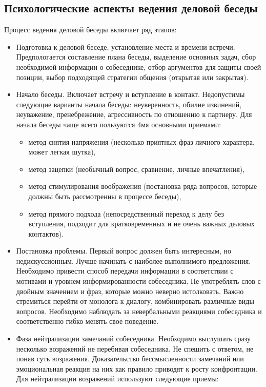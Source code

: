 \subsection{Психологические аспекты ведения деловой беседы}
Процесс ведения деловой беседы включает ряд этапов:
\begin{itemize}
	\item Подготовка к деловой беседе, установление места и времени встречи. Предпологается составление плана беседы, выделение основных задач, сбор необходимой информации о собеседнике, отбор аргументов для защиты своей позиции, выбор подходящей стратегии общения (открытая или закрытая).
	\item Начало беседы. Включает встречу и вступление в контакт. Недопустимы следующие варианты начала беседы: неуверенность, обилие извинений, неуважение, пренебрежение, агрессивность по отношению к партнеру. Для начала беседы чаще всего пользуются 4мя основными приемами:
		\begin{itemize}
			\item метод снятия напряжения (несколько приятных фраз личного характера, может легкая шутка),
			\item метод зацепки (необычный вопрос, сравнение, личные впечатления),
			\item метод стимулирования воображения (постановка ряда вопросов, которые должны быть рассмотренны в процессе беседы),
			\item метод прямого подхода (непосредственный переход к делу без вступления, подходит для кратковременных и не очень важных деловых контактов).
		\end{itemize}
	\item Постановка проблемы. Первый вопрос должен быть интересным, но недискуссионным. Лучше начинать с наиболее выполнимого предложения. Необходимо привести способ передачи информации в соответствии с мотивами и уровнем информированности собеседника. Не употреблять слов с двойным значением и фраз, которые можно неверно истолковать. Важно стремиться перейти от монолога к диалогу, комбинировать различные виды вопросов. Необходимо наблюдать за невербальными реакциями собеседника и соответственно гибко менять свое поведение.
	\item Фаза нейтрализации замечаний собеседника. Необходимо выслушать сразу несколько возражений не перебивая собеседника. Не спешить с ответом, не поняв суть возражения. Доказательство бессмысленности замечаний или эмоциональная реакция на них как правило приводят к росту конфронтации. Для нейтрализации возражений используют следующие приемы:

\end{itemize}
